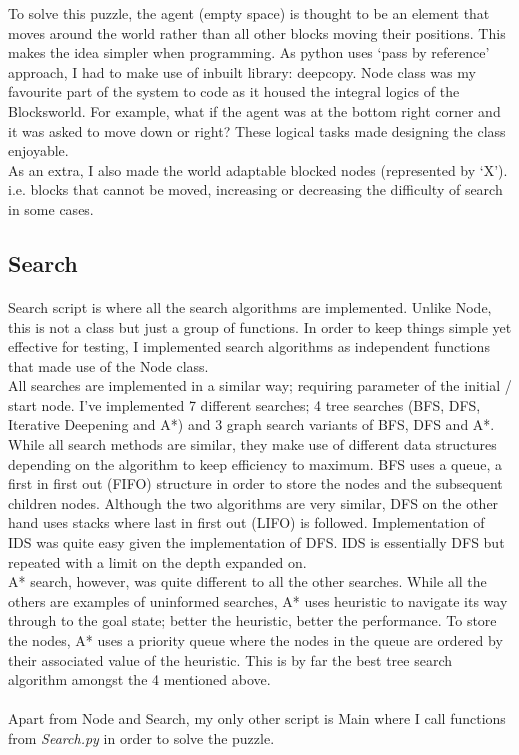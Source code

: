 \documentclass[10pt]{article}
\begin{document}
  To solve this puzzle, the agent (empty space) is thought to be an element that moves around the world rather than all other blocks moving their positions. This makes the idea simpler when programming. As python uses `pass by reference' approach, I had to make use of inbuilt library: deepcopy. Node class was my favourite part of the system to code as it housed the integral logics of the Blocksworld. For example, what if the agent was at the bottom right corner and it was asked to move down or right? These logical tasks made designing the class enjoyable.\\

  As an extra, I also made the world adaptable blocked nodes (represented by `X'). i.e. blocks that cannot be moved, increasing or decreasing the difficulty of search in some cases. 


  \subsection{Search}
  \paragraph{} \indent
  Search script is where all the search algorithms are implemented. Unlike Node, this is not a class but just a group of functions. In order to keep things simple yet effective for testing, I implemented search algorithms as independent functions that made use of the Node class. \\
  
  All searches are implemented in a similar way; requiring parameter of the initial / start node. I’ve implemented 7 different searches; 4 tree searches (BFS, DFS, Iterative Deepening and A*) and 3 graph search variants of BFS, DFS and A*. \\

  While all search methods are similar, they make use of different data structures depending on the algorithm to keep efficiency to maximum. BFS uses a queue, a first in first out (FIFO) structure in order to store the nodes and the subsequent children nodes. Although the two algorithms are very similar, DFS on the other hand uses stacks where last in first out (LIFO) is followed. Implementation of IDS was quite easy given the implementation of DFS. IDS is essentially DFS but repeated with a limit on the depth expanded on. \\

  A* search, however, was quite different to all the other searches. While all the others are examples of uninformed searches, A* uses heuristic to navigate its way through to the goal state; better the heuristic, better the performance. To store the nodes, A* uses a priority queue where the nodes in the queue are ordered by their associated value of the heuristic. This is by far the best tree search algorithm amongst the 4 mentioned above. \\ \\
Apart from Node and Search, my only other script is Main where I call functions from \textit{Search.py} in order to solve the puzzle.
\end{document}
